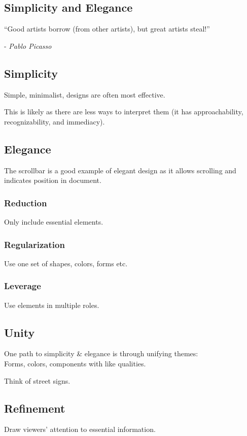 \subsection{Simplicity and Elegance}
\begin{shaded}
``Good artists borrow (from other artists), but great
artists steal!'' 

- \textit{Pablo Picasso}
\end{shaded}

\subsection{Simplicity}
Simple, minimalist, designs are often most effective. 

This is likely as there are less ways to interpret them (it has approachability, recognizability, and immediacy).

\subsection{Elegance}
The scrollbar is a good example of elegant design as it allows scrolling and indicates position in document.

\subsubsection{Reduction}
Only include essential elements.

\subsubsection{Regularization}
Use one set of shapes, colors, forms etc.

\subsubsection{Leverage}
Use elements in multiple roles.

\subsection{Unity}
One path to simplicity \& elegance is through unifying themes:\\
Forms, colors, components with like qualities.

Think of street signs.

\subsection{Refinement}
Draw viewers’ attention to essential information.

